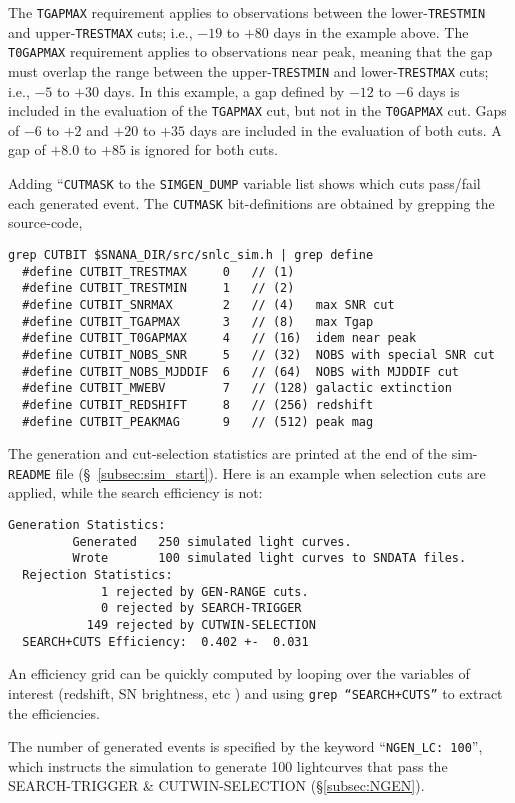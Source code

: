 \documentclass[12pt]{article}
\newcommand{\obs}{observation}
\begin{document}
{The {\tt TGAPMAX} requirement applies to \obs s
between the lower-{\tt TRESTMIN} and upper-{\tt TRESTMAX} cuts;
i.e., $-19$ to $+80$ days in the example above.
The {\tt T0GAPMAX} requirement applies to \obs s near peak,
meaning that the gap must overlap the range between 
the upper-{\tt TRESTMIN} and lower-{\tt TRESTMAX} cuts;
i.e., $-5$ to $+30$ days.  
In this example, a gap defined by $-12$ to $-6$ days 
is included in the evaluation of the {\tt TGAPMAX} cut, 
but not in the {\tt T0GAPMAX} cut. 
Gaps of $-6$ to $+2$ and  $+20$ to $+35$ days
are included in the evaluation of both cuts. 
A gap of $+8.0$ to $+85$ is ignored for both cuts.


Adding ``{\tt CUTMASK} to the {\tt SIMGEN\_DUMP} variable list 
shows which cuts pass/fail each generated event. The {\tt CUTMASK}
bit-definitions are obtained by grepping the source-code,
%
\begin{Verbatim}[frame=single]
  grep CUTBIT $SNANA_DIR/src/snlc_sim.h | grep define
  #define CUTBIT_TRESTMAX     0   // (1)
  #define CUTBIT_TRESTMIN     1   // (2)
  #define CUTBIT_SNRMAX       2   // (4)   max SNR cut 
  #define CUTBIT_TGAPMAX      3   // (8)   max Tgap
  #define CUTBIT_T0GAPMAX     4   // (16)  idem near peak
  #define CUTBIT_NOBS_SNR     5   // (32)  NOBS with special SNR cut
  #define CUTBIT_NOBS_MJDDIF  6   // (64)  NOBS with MJDDIF cut
  #define CUTBIT_MWEBV        7   // (128) galactic extinction
  #define CUTBIT_REDSHIFT     8   // (256) redshift
  #define CUTBIT_PEAKMAG      9   // (512) peak mag
\end{Verbatim}

The generation and cut-selection statistics are printed 
at the end of the sim-{\tt README} file 
(\S~\ref{subsec:sim_start}).
Here is an example when selection cuts are applied,
while the search efficiency is not:
%
\begin{Verbatim}[frame=single]
  Generation Statistics: 
         Generated   250 simulated light curves. 
         Wrote       100 simulated light curves to SNDATA files. 
  Rejection Statistics: 
             1 rejected by GEN-RANGE cuts. 
             0 rejected by SEARCH-TRIGGER
           149 rejected by CUTWIN-SELECTION
  SEARCH+CUTS Efficiency:  0.402 +-  0.031 
\end{Verbatim}
%
An efficiency grid can be quickly computed by
looping over the variables of interest (redshift, SN brightness, etc )
and using {\tt grep ``SEARCH+CUTS''}  to extract the efficiencies.

The number of generated events is specified by the keyword
``{\tt NGEN\_LC: 100}'',
which instructs the simulation to generate 100 lightcurves
that pass the SEARCH-TRIGGER \& CUTWIN-SELECTION
(\S\ref{subsec:NGEN}).

}
\end{document}
